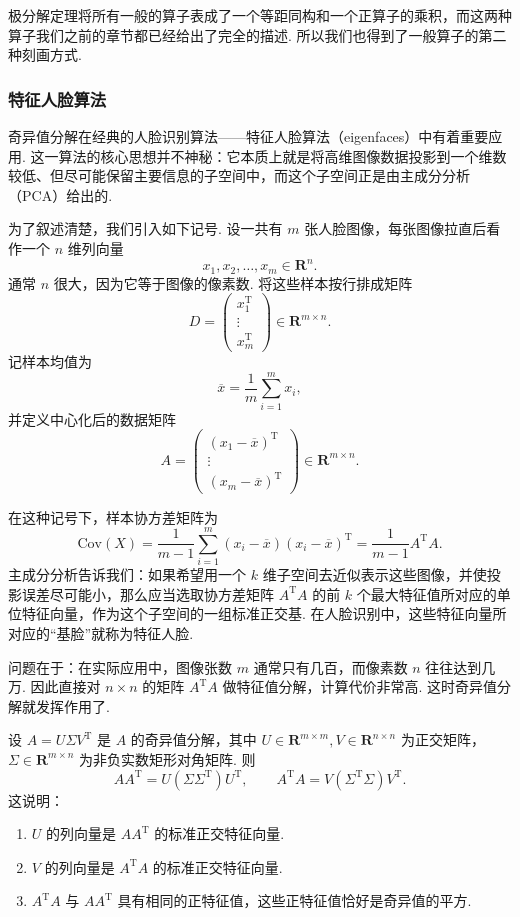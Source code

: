 极分解定理将所有一般的算子表成了一个等距同构和一个正算子的乘积，而这两种算子我们之前的章节都已经给出了完全的描述. 所以我们也得到了一般算子的第二种刻画方式.

\subsubsection*{特征人脸算法}

奇异值分解在经典的人脸识别算法——特征人脸算法（eigenfaces）中有着重要应用. 这一算法的核心思想并不神秘：它本质上就是将高维图像数据投影到一个维数较低、但尽可能保留主要信息的子空间中，而这个子空间正是由主成分分析（PCA）给出的.

为了叙述清楚，我们引入如下记号. 设一共有 $m$ 张人脸图像，每张图像拉直后看作一个 $n$ 维列向量
\[
    x_1, x_2, \ldots, x_m \in \mathbf{R}^n.
\]
通常 $n$ 很大，因为它等于图像的像素数. 将这些样本按行排成矩阵
\[
    D =
    \begin{pmatrix}
        x_1^{\mathrm{T}} \\
        \vdots           \\
        x_m^{\mathrm{T}}
    \end{pmatrix}
    \in \mathbf{R}^{m \times n}.
\]
记样本均值为
\[
    \overline{x} = \frac{1}{m}\sum_{i=1}^m x_i,
\]
并定义中心化后的数据矩阵
\[
    A =
    \begin{pmatrix}
        (x_1-\overline{x})^{\mathrm{T}} \\
        \vdots                          \\
        (x_m-\overline{x})^{\mathrm{T}}
    \end{pmatrix}
    \in \mathbf{R}^{m \times n}.
\]

在这种记号下，样本协方差矩阵为
\[
    \mathrm{Cov}(X)
    = \frac{1}{m-1}\sum_{i=1}^m (x_i-\overline{x})(x_i-\overline{x})^{\mathrm{T}}
    = \frac{1}{m-1}A^{\mathrm{T}}A.
\]
主成分分析告诉我们：如果希望用一个 $k$ 维子空间去近似表示这些图像，并使投影误差尽可能小，那么应当选取协方差矩阵 $A^{\mathrm{T}}A$ 的前 $k$ 个最大特征值所对应的单位特征向量，作为这个子空间的一组标准正交基. 在人脸识别中，这些特征向量所对应的``基脸''就称为特征人脸.

问题在于：在实际应用中，图像张数 $m$ 通常只有几百，而像素数 $n$ 往往达到几万. 因此直接对 $n \times n$ 的矩阵 $A^{\mathrm{T}}A$ 做特征值分解，计算代价非常高. 这时奇异值分解就发挥作用了.

设 $A = U\Sigma V^{\mathrm{T}}$ 是 $A$ 的奇异值分解，其中 $U \in \mathbf{R}^{m \times m}, V \in \mathbf{R}^{n \times n}$ 为正交矩阵，$\Sigma \in \mathbf{R}^{m \times n}$ 为非负实数矩形对角矩阵. 则
\[
    AA^{\mathrm{T}} = U(\Sigma \Sigma^{\mathrm{T}})U^{\mathrm{T}},\qquad
    A^{\mathrm{T}}A = V(\Sigma^{\mathrm{T}}\Sigma)V^{\mathrm{T}}.
\]
这说明：
\begin{enumerate}
    \item $U$ 的列向量是 $AA^{\mathrm{T}}$ 的标准正交特征向量.

    \item $V$ 的列向量是 $A^{\mathrm{T}}A$ 的标准正交特征向量.

    \item $A^{\mathrm{T}}A$ 与 $AA^{\mathrm{T}}$ 具有相同的正特征值，这些正特征值恰好是奇异值的平方.
\end{enumerate}

